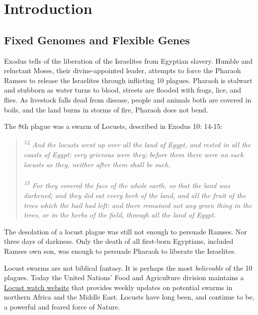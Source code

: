 \chapter{Introduction}  \label{Intro} 

\section{Fixed Genomes and Flexible Genes}
  \label{Intro:sec:Fixed Genomes and Flexible Genes} 

  Exodus tells of the liberation of the Israelites from Egyptian slavery. Humble and reluctant Moses, their divine-appointed leader, attempts to force the Pharaoh Ramses to release the Israelites through inflicting 10 plagues. Pharaoh is stalwart and stubborn as water turns to blood, streets are flooded with frogs, lice, and flies. As livestock falls dead from disease, people and animals both are covered in boils, and the land burns in storms of fire, Pharaoh does not bend.

  The 8th plague was a swarm of Locusts, described in Exodus 10: 14-15:

  \begin{quote}
    \itshape
    \singlespacing
    \textsuperscript{14} And the locusts went up over all the land of Egypt, and rested in all the coasts of Egypt: very grievous were they; before them there were no such locusts as they, neither after them shall be such.\\ 
      \\
    \textsuperscript{15} For they covered the face of the whole earth, so that the land was darkened; and they did eat every herb of the land, and all the fruit of the trees which the hail had left: and there remained not any green thing in the trees, or in the herbs of the field, through all the land of Egypt.
    \end{quote}

  The desolation of a locust plague was still not enough to persuade Ramses. Nor three days of darkness. Only the death of all first-born Egyptians, included Ramses own son, was enough to persuade Pharaoh to liberate the Israelites.

  Locust swarms are not biblical fantasy. It is perhaps the most \textit{believable} of the 10 plagues. Today the United Nations' Food and Agriculture division maintains a \href{http://www.fao.org/ag/locusts/en/info/info/news/index.html}{Locust watch website} that provides weekly updates on potential swarms in northern Africa and the Middle East. Locusts have long been, and continue to be, a powerful and feared force of Nature.

